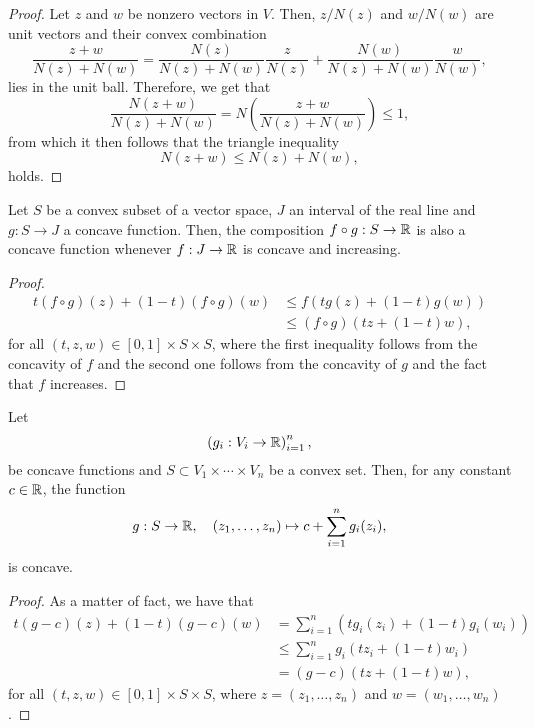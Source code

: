 \begin{proof}
  Let \(z\) and \(w\) be nonzero vectors in \(V\). Then, \(z/N(z)\) and
  \(w/N(w)\) are unit vectors and their convex combination
  \[
    \frac{z+w}{N(z)+N(w)}
    =
    \frac{N(z)}{N(z)+N(w)}\frac{z}{N(z)}
    +
    \frac{N(w)}{N(z)+N(w)}\frac{w}{N(w)}
    ,
  \]
  lies in the unit ball. Therefore, we get that
  \[
    \frac{N(z+w)}{N(z)+N(w)}
    =
    N\left(\frac{z+w}{N(z)+N(w)}\right)\leqslant{1},
  \]
  from which it then follows that the triangle inequality
  \[
    N(z+w)\leqslant{N(z)+N(w)},
  \]
  holds.
\end{proof}

\begin{lemma}\label{lemma:concavity-of-compositions-of-concave-functions}
  Let \(S\) be a convex subset of a vector space, \(J\) an interval of the real
  line and \(g:S\to{J}\) a concave function. Then, the composition
  \(f\circ{g}:S\to\mathbb{R}\) is also a concave function whenever \(f:J\to\mathbb{R}\)
  is concave and increasing.
\end{lemma}

\begin{proof}
  \begin{align*}
    t(f\circ{g})(z)+(1-t)(f\circ{g})(w)
    &\leqslant{f(tg(z)+(1-t)g(w))}\\
    &\leqslant{(f\circ{g})(tz+(1-t)w)},
  \end{align*}
  for all \((t,z,w)\in{[0,1]\times{S}\times{S}}\), where the first inequality
  follows from the concavity of \(f\) and the second one follows from the
  concavity of \(g\) and the fact that \(f\) increases.
\end{proof}

\begin{lemma}\label{lemma:concavity-of-sums-of-concave-functions}
  Let
  \[
    \left(g_{i}:V_{i}\to\mathbb{R}\right)_{i=1}^{n},
  \]
  be concave functions and \(S\subset{V_{1}\times\cdots\times{V_{n}}}\) be a
  convex set. Then, for any constant \(c\in\mathbb{R}\), the function
  \[
    g:S\to\mathbb{R},\quad{(z_{1},\ldots,z_{n})\mapsto{c+\sum_{i=1}^{n}g_{i}(z_{i})}},
  \]
  is concave.
\end{lemma}

\begin{proof}
  As a matter of fact, we have that
  \begin{align*}
    t(g-c)(z)+(1-t)(g-c)(w)
    &=
    \sum_{i=1}^{n}\left(tg_{i}(z_{i})+(1-t)g_{i}(w_{i})\right)
    \\
    &\leqslant
    \sum_{i=1}^{n}g_{i}\left(tz_{i}+(1-t)w_{i}\right)
    \\
    &=
    (g-c)\left(tz+(1-t)w\right),
  \end{align*}
  for all \((t,z,w)\in{[0,1]\times{S}\times{S}}\), where
  \(z=(z_{1},\ldots,z_{n})\) and \(w=(w_{1},\ldots,w_{n})\).
\end{proof}

